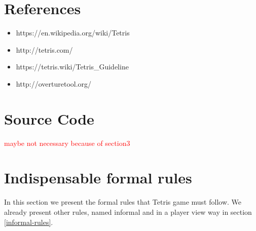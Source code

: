 \documentclass[a4paper]{article}
\begin{document}
\section{References}

\begin{itemize}
	
\item https://en.wikipedia.org/wiki/Tetris
\item http://tetris.com/
\item https://tetris.wiki/Tetris\_Guideline
\item http://overturetool.org/

\end{itemize}

\newpage
\appendix
\section{Source Code}
\textcolor{red}{maybe not necessary because of section3}

\section{Indispensable formal rules}\label{rules}
In this section we present the formal rules that Tetris game must follow. We already present other rules, named informal and in a player view way in section \ref{informal-rules}.
\end{document}
